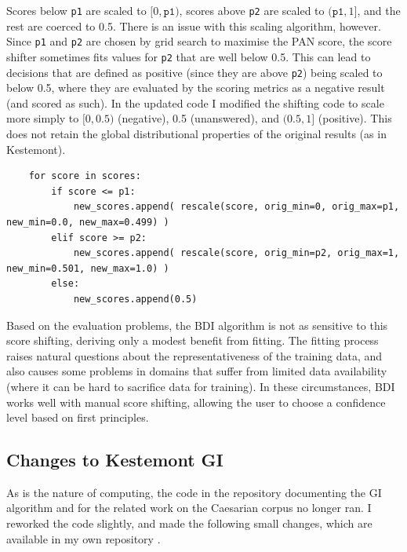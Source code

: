\documentclass[
    hf
]{ceurart}
\begin{document}
Scores below \texttt{p1} are scaled to $[0,\texttt{p1})$, scores above
                \texttt{p2} are scaled to $(\texttt{p1},1]$, and the rest are coerced to 0.5.
There is an issue with this scaling algorithm, however. Since \texttt{p1} and
\texttt{p2} are chosen by grid search to maximise the PAN score, the score
shifter sometimes fits values for \texttt{p2} that are well below 0.5. This can
lead to decisions that are defined as positive (since they are above
\texttt{p2}) being scaled to below 0.5, where they are evaluated by the scoring
metrics as a negative result (and scored as such). In the updated code I
modified the shifting code to scale more simply to $[0,0.5)$ (negative), 0.5
                (unanswered), and $(0.5,1]$ (positive). This does not retain the global
distributional properties of the original results (as in Kestemont).

\begin{verbatim}
    for score in scores: 
        if score <= p1: 
            new_scores.append( rescale(score, orig_min=0, orig_max=p1, new_min=0.0, new_max=0.499) ) 
        elif score >= p2: 
            new_scores.append( rescale(score, orig_min=p2, orig_max=1, new_min=0.501, new_max=1.0) )
        else: 
            new_scores.append(0.5)
\end{verbatim}

Based on the evaluation problems, the BDI algorithm is not as sensitive to this
score shifting, deriving only a modest benefit from fitting. The fitting process
raises natural questions about the representativeness of the training data, and
also causes some problems in domains that suffer from limited data availability
(where it can be hard to sacrifice data for training). In these circumstances, BDI
works well with manual score shifting, allowing the user to choose a confidence
level based on first principles.

\subsection{Changes to Kestemont GI}

As is the nature of computing, the code in the repository documenting the GI
algorithm and for the related work on the Caesarian corpus no longer ran. I
reworked the code slightly, and made the following small changes, which are
available in my own repository \cite{nagy_ruzicka}.
\end{document}
